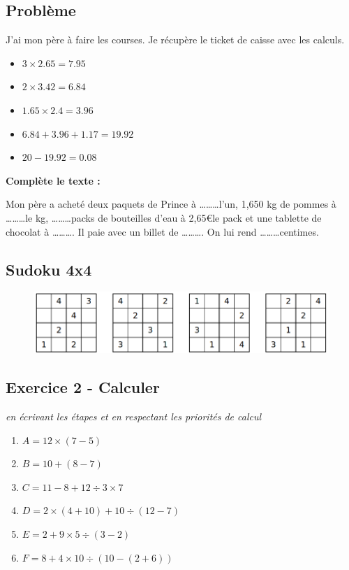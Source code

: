 \subsection*{Problème}

J'ai mon père à faire les courses. Je récupère le ticket de caisse avec les calculs.
\begin{itemize}
  \item $3 \times 2.65 = 7.95$
  \item $2 \times 3.42 = 6.84$
  \item $1.65 \times 2.4 = 3.96$
  \item $6.84 + 3.96 + 1.17 = 19.92$
  \item $20 - 19.92 = 0.08$
\end{itemize}

\textbf{Complète le texte : }

Mon père a acheté deux paquets de Prince à \ldots\ldots\ldots l'un, 1,650 kg de pommes à \ldots\ldots\ldots le kg, \ldots\ldots\ldots packs de bouteilles d'eau à 2,65\euro le pack et une tablette de chocolat à \ldots\ldots\ldots . Il paie avec un billet de \ldots\ldots\ldots . On lui rend \ldots\ldots\ldots centimes.

\subsection*{Sudoku 4x4}

\begin{figure}[H]
  \centering
  \includegraphics[width=0.8\linewidth]{5x1-calculs/sudoku-4a.png}
\end{figure}

\newpage

\subsection*{Exercice 2 - Calculer}
\textit{en écrivant les étapes et en respectant les priorités de calcul}

\begin{multicols}{3}\noindent

  \begin{enumerate}
    \item $A = 12 \times (7-5)$ 
    \item $B = 10 + (8 - 7)$ 
    \item $C = 11 - 8 + 12 \div 3 \times 7$ 
    \item $D = 2 \times (4+10) + 10 \div (12-7)$ 
    \item $E = 2 + 9 \times 5 \div (3-2)$ 
    \item $F = 8 + 4 \times 10\div (10-(2+6))$ 
  \end{enumerate}

\end{multicols}

